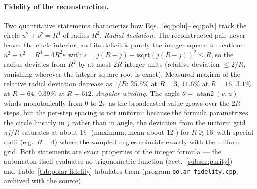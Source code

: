 \documentclass[a4paper]{article}
\begin{document}
\paragraph{Fidelity of the reconstruction.}  Two quantitative statements characterize how Eqs.~\eqref{eq:polu}--\eqref{eq:polv} track the circle $u^{2}+v^{2}=R^{4}$ of radius $R^{2}$.  \emph{Radial deviation.}  The reconstructed pair never leaves the circle interior, and its deficit is purely the integer-square truncation: $u^{2}+v^{2}=R^{4}-4R^{2}\varepsilon$ with $\varepsilon=j(R-j)-\mathrm{isqrt}(j(R-j))^{2}\le R$, so the radius deviates from $R^{2}$ by at most $2R$ integer units (relative deviation $\le2/R$, vanishing wherever the integer square root is exact).  Measured maxima of the relative radial deviation decrease as $1/R$: $25.5\%$ at $R=3$, $11.6\%$ at $R=16$, $3.1\%$ at $R=64$, $0.39\%$ at $R=512$.  \emph{Angular winding.}  The angle $\theta=\operatorname{atan2}(v,u)$ winds monotonically from $0$ to $2\pi$ as the broadcasted value grows over the $2R$ steps, but the per-step spacing is not uniform: because the formula parametrizes the circle linearly in $j$ rather than in angle, the deviation from the uniform grid $\pi j/R$ saturates at about $19^{\circ}$ (maximum; mean about $12^{\circ}$) for $R\gtrsim16$, with special radii (e.g.\ $R=4$) where the sampled angles coincide exactly with the uniform grid.  Both statements are exact properties of the integer formula --- the automaton itself evaluates no trigonometric function (Sect.~\ref{subsec:purity}) --- and Table~\ref{tab:polar-fidelity} tabulates them (program \texttt{polar\_fidelity.cpp}, archived with the source).
\end{document}
